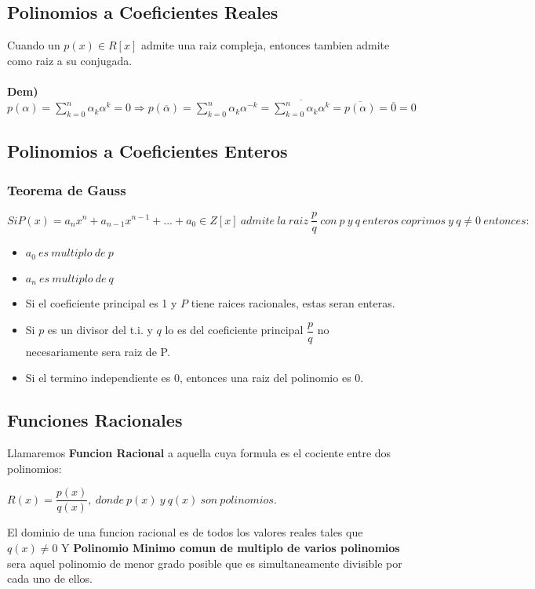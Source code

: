 \documentclass[10pt]{article}
\begin{document}
\subsection{Polinomios a Coeficientes Reales}
Cuando un $p(x) \in R[x]$ admite una raiz compleja, entonces tambien admite como raiz a su conjugada.\\
\\
\textbf{Dem) }$p(\alpha) = \sum\limits_{k=0}^n\alpha_k \alpha^k=0 \Rightarrow p(\overline{\alpha}) = \sum\limits_{k=0}^n\alpha_k \alpha^{-k}= \overline{\sum\limits_{k=0}^n\alpha_k \alpha^{k}} = \overline{p(\alpha)} = \overline{0} = 0$
\subsection{Polinomios a Coeficientes Enteros}
\subsubsection{Teorema de Gauss}
\begin{mdframed}[roundcorner=10pt]
$Si P(x)=a_nx^n+a_{n-1}x^{n-1}+...+a_0 \in Z[x]\ admite\ la\ raiz\ \dfrac{p}{q}\ con\ p\ y\ q\ enteros\ coprimos\ y\ q \not = 0\ entonces:$
\begin{itemize}
\item $a_0\ es\ multiplo\ de\ p$
\item $a_n\ es\ multiplo\ de\ q$
\item Si el coeficiente principal es 1 y $P$ tiene raices racionales, estas seran enteras.
\item Si $p$ es un divisor del t.i. y $q$ lo es del coeficiente principal $\dfrac{p}{q}$ no necesariamente sera raiz de P.
\item Si el termino independiente es 0, entonces una raiz del polinomio es 0.
\end{itemize}
\end{mdframed}
\subsection{Funciones Racionales}
Llamaremos \textbf{Funcion Racional} a aquella cuya formula es el cociente entre dos polinomios:\\
\begin{center}
$R(x)=\dfrac{p(x)}{q(x)},\ donde\ p(x)\ y\ q(x)\ son\ polinomios.$
\end{center}
El dominio de una funcion racional es de todos los valores reales tales que $q(x) \not = 0$
Y \textbf{Polinomio Minimo comun de multiplo de varios polinomios} sera aquel polinomio de menor grado posible que es simultaneamente divisible por cada uno de ellos.
\newpage
\end{document}
